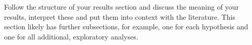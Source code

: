 Follow the structure of your results section and discuss the meaning of your results, interpret these and put them into context with the literature. This section likely has further subsections, for example, one for each hypothesis and one for all additional, exploratory analyses.